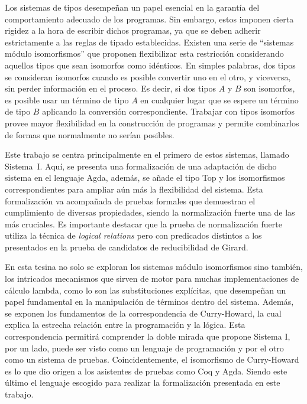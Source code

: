 Los sistemas de tipos desempeñan un papel esencial en la garantía del comportamiento adecuado de los programas.
Sin embargo, estos imponen cierta rigidez a la hora de escribir dichos programas, ya que se deben adherir estrictamente a las reglas de tipado establecidas.
Existen una serie de ``sistemas módulo isomorfismos'' \cite{system-i,extensional-proofs, dist-lambda,lambda-plus,sip,sip-paper} que proponen flexibilizar esta restricción considerando aquellos tipos que sean isomorfos como idénticos.
En simples palabras, dos tipos se consideran isomorfos cuando es posible convertir uno en el otro, y viceversa, sin perder información en el proceso.
Es decir, si dos tipos $A$ y $B$ son isomorfos, es posible usar un término de tipo $A$ en cualquier lugar que se espere un término de tipo $B$ aplicando la conversión correspondiente.
Trabajar con tipos isomorfos provee mayor flexibilidad en la construcción de programas y permite combinarlos de formas que normalmente no serían posibles.

Este trabajo se centra principalmente en el primero de estos sistemas, llamado Sistema~I.
Aquí, se presenta una formalización de una adaptación de dicho sistema en el lenguaje Agda, además, se añade el tipo Top y los isomorfismos correspondientes para ampliar aún más la flexibilidad del sistema.
Esta formalización va acompañada de pruebas formales que demuestran el cumplimiento de diversas propiedades, siendo la normalización fuerte una de las más cruciales.
Es importante destacar que la prueba de normalización fuerte utiliza la técnica de \textit{logical relations} pero con predicados distintos a los presentados en la prueba de candidatos de reducibilidad de Girard.

En esta tesina no solo se exploran los sistemas módulo isomorfismos sino también, los intricados mecanismos que sirven de motor para muchas implementaciones de cálculo lambda, como lo son las substituciones explícitas, que desempeñan un papel fundamental en la manipulación de términos dentro del sistema.
Además, se exponen los fundamentos de la correspondencia de Curry-Howard, la cual explica la estrecha relación entre la programación y la lógica.
Esta correspondencia permitirá comprender la doble mirada que propone Sistema I, por un lado, puede ser visto como un lenguaje de programación y por el otro como un sistema de pruebas.
Coincidentemente, el isomorfismo de Curry-Howard es lo que dio origen a los asistentes de pruebas como Coq y Agda.
Siendo este último el lenguaje escogido para realizar la formalización presentada en este trabajo.